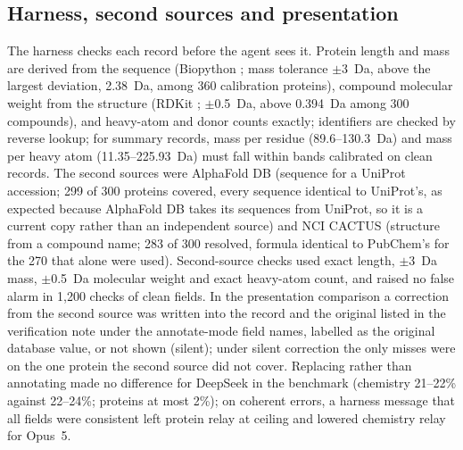 \subsection*{Harness, second sources and presentation}
The harness checks each record before the agent sees it. Protein length and mass are derived from the sequence (Biopython \cite{cock2009biopython}; mass tolerance $\pm$3~Da, above the largest deviation, 2.38~Da, among 360 calibration proteins), compound molecular weight from the structure (RDKit \cite{rdkit}; $\pm$0.5~Da, above 0.394~Da among 300 compounds), and heavy-atom and donor counts exactly; identifiers are checked by reverse lookup; for summary records, mass per residue (89.6--130.3~Da) and mass per heavy atom (11.35--225.93~Da) must fall within bands calibrated on clean records. The second sources were AlphaFold DB (sequence for a UniProt accession; 299 of 300 proteins covered, every sequence identical to UniProt's, as expected because AlphaFold DB takes its sequences from UniProt, so it is a current copy rather than an independent source) and NCI CACTUS (structure from a compound name; 283 of 300 resolved, formula identical to PubChem's for the 270 that alone were used). Second-source checks used exact length, $\pm$3~Da mass, $\pm$0.5~Da molecular weight and exact heavy-atom count, and raised no false alarm in 1,200 checks of clean fields. In the presentation comparison a correction from the second source was written into the record and the original listed in the verification note under the annotate-mode field names, labelled as the original database value, or not shown (silent); under silent correction the only misses were on the one protein the second source did not cover. Replacing rather than annotating made no difference for DeepSeek in the benchmark (chemistry 21--22\% against 22--24\%; proteins at most 2\%); on coherent errors, a harness message that all fields were consistent left protein relay at ceiling and lowered chemistry relay for Opus~5.

